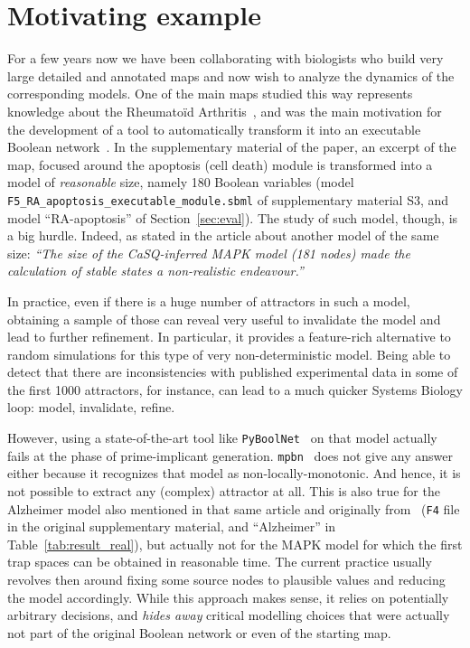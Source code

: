 \documentclass[preprint,12pt]{elsarticle}
\begin{document}
\section{Motivating example}
\label{sec:case_study}

For a few years now we have been collaborating with biologists who build very large detailed and annotated maps and now wish to analyze the dynamics of the corresponding models.
One of the main maps studied this way represents knowledge about the Rheumatoïd Arthritis~\cite{singh2018computational}, and was the main motivation for the development of a tool to automatically transform it into an executable Boolean network~\cite{aghamiri2020automated}.
In the supplementary material of the paper, an excerpt of the map, focused around the apoptosis (cell death) module is transformed into a model of \emph{reasonable} size, namely 180 Boolean variables (model \verb|F5_RA_apoptosis_executable_module.sbml| of supplementary material S3, and model ``RA-apoptosis'' of Section~\ref{sec:eval}).
The study of such model, though, is a big hurdle.
Indeed, as stated in the article about another model of the same size:
\emph{``The size of the CaSQ-inferred MAPK model (181 nodes) made the calculation of stable states a non-realistic endeavour.''}

In practice, even if there is a huge number of attractors in such a model, obtaining a sample of those can reveal very useful to invalidate the model and lead to further refinement.
In particular, it provides a feature-rich alternative to random simulations for this type of very non-deterministic model.
Being able to detect that there are inconsistencies with published experimental data in some of the first 1000 attractors, for instance, can lead to a much quicker Systems Biology loop: model, invalidate, refine.

However, using a state-of-the-art tool like \texttt{PyBoolNet}~\cite{klarner2015computing} on that model actually fails at the phase of prime-implicant generation.
\texttt{mpbn}~\cite{Paulev2020} does not give any answer either because it recognizes that model as non-locally-monotonic.
And hence, it is not possible to extract any (complex) attractor at all.
This is also true for the Alzheimer model also mentioned in that same article and originally from~\cite{ogishima2016alzpathway} (\verb|F4| file in the original supplementary material, and ``Alzheimer'' in Table~\ref{tab:result_real}), but actually not for the MAPK model for which the first trap spaces can be obtained in reasonable time.
The current practice usually revolves then around fixing some source nodes to plausible values and reducing the model accordingly.
While this approach makes sense, it relies on potentially arbitrary decisions, and \emph{hides away} critical modelling choices that were actually not part of the original Boolean network or even of the starting map.
\end{document}
